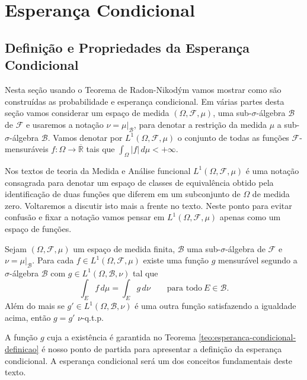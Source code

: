 \chapter[Aula 13]{Esperança Condicional}
\chaptermark{}


\section{Definição e Propriedades da Esperança Condicional} 
Nesta seção usando o Teorema de Radon-Nikodým vamos mostrar 
como são construídas as probabilidade e esperança 
condicional. 
Em várias partes desta seção vamos considerar 
um espaço de medida $(\Omega,\mathcal{F},\mu)$, 
uma sub-$\sigma$-álgebra $\mathcal{B}$ de $\mathcal{F}$ 
e usaremos a notação $\nu=\mu|_{\mathcal{B}}$, 
para denotar a restrição da medida $\mu$ 
a sub-$\sigma$-álgebra $\mathcal{B}$. 
Vamos denotar por $L^1(\Omega,\mathcal{F},\mu)$ o conjunto 
de todas as funções $\mathcal{F}$-mensuráveis 
$f:\Omega\to\overline{\mathbb{R}}$ 
tais que $\int_{\Omega} |f|\, d\mu <+\infty$. 

\begin{observacao}
Nos textos de teoria da Medida e Análise funcional
$L^1(\Omega,\mathcal{F},\mu)$ é uma notação consagrada para 
denotar um espaço de classes de equivalência obtido 
pela identificação de duas funções que diferem em um 
subconjunto de $\Omega$ de medida zero. 
Voltaremos a discutir isto mais a frente no texto. 
Neste ponto para evitar confusão e fixar a notação 
vamos pensar em $L^1(\Omega,\mathcal{F},\mu)$ 
apenas como um espaço de funções.
\end{observacao}


\begin{teorema}\label{teo:esperanca-condicional-definicao} 
Sejam $(\Omega,\mathcal{F},\mu)$ um espaço de medida finita, 
$\mathcal{B}$ uma sub-$\sigma$-álgebra de $\mathcal{F}$ 
e $\nu=\mu|_{\mathcal{B}}$. 
Para cada $f\in L^1(\Omega,\mathcal{F},\mu)$ 
existe uma função $g$ mensurável segundo a 
$\sigma$-álgebra $\mathcal{B}$ 
com $g\in L^1(\Omega,\mathcal{B},\nu)$ tal que 
\[
\int_{E} f\, d\mu 
=
\int_{E} g\, d\nu \qquad \text{para todo} \ E\in\mathcal{B}.
\]
Além do mais se $g'\in L^1(\Omega,\mathcal{B},\nu)$ 
é uma outra função satisfazendo a igualdade acima, 
então $g=g'$ $\nu$-q.t.p. 
\end{teorema}

\begin{observacao}
A função $g$ cuja a existência é garantida 
no Teorema \eqref{teo:esperanca-condicional-definicao} 
é nosso ponto de partida para apresentar a definição 
da esperança condicional.
A esperança condicional será um dos conceitos 
fundamentais deste texto.
\end{observacao}



